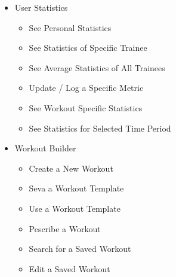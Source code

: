 \begin{itemize}
    \item User Statistics
    \begin{itemize}
        \item See Personal Statistics
        \item See Statistics of Specific Trainee
        \item See Average Statistics of All Trainees
        \item Update / Log a Specific Metric
        \item See Workout Specific Statistics
        \item See Statistics for Selected Time Period
    \end{itemize}

    \item Workout Builder
    \begin{itemize}
        \item Create a New Workout
        \item Seva a Workout Template
        \item Use a Workout Template
        \item Pescribe a Workout
        \item Search for a Saved Workout
        \item Edit a Saved Workout
    \end{itemize}

\end{itemize}
\clearpage

